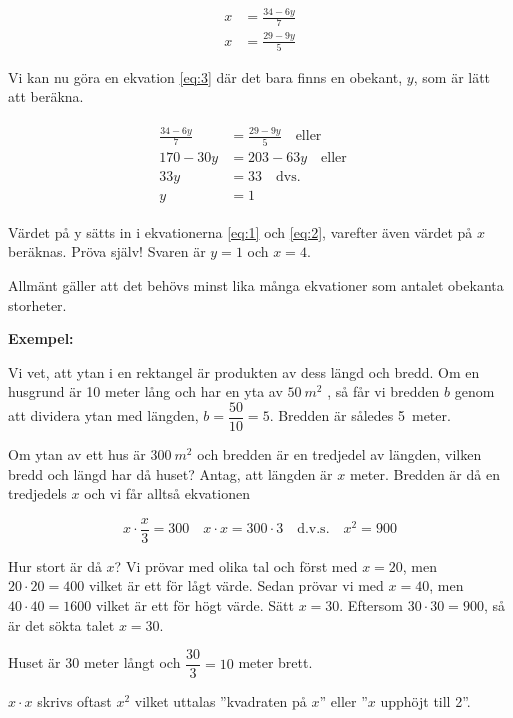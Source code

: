 \begin{align}
  \label{eq:1}
  x &= \frac{34-6y}{7}\\
  \label{eq:2}
  x &= \frac{29-9y}{5}
\end{align}

Vi kan nu göra en ekvation \ref{eq:3} där det bara finns en obekant, \(y\),
som är lätt att beräkna.

\begin{align}
  \begin{split}
    \label{eq:3}
    \frac{34 - 6y}{7} &= \frac{29 - 9y}{5}
    \quad \text{eller} \\
    170 - 30y &= 203-63y
    \quad \text{eller} \quad \\
    33y &= 33
    \quad \text{dvs.} \quad \\
    y &= 1
  \end{split}
\end{align}

Värdet på y sätts in i ekvationerna \ref{eq:1} och \ref{eq:2}, varefter även
värdet på \(x\) beräknas.
Pröva själv! Svaren är \(y = 1\) och \(x = 4\).

Allmänt gäller att det behövs minst lika många ekvationer som antalet obekanta
storheter.

\textbf{Exempel:}

Vi vet, att ytan i en rektangel är produkten av dess längd och bredd.
Om en husgrund är 10 meter lång och har en yta av \(50\ m^2\) , så får vi bredden
\(b\) genom att dividera ytan med längden, \(b = \dfrac{50}{10} = 5\).
Bredden är således 5~meter.

Om ytan av ett hus är \(300\ m^2\) och bredden är en tredjedel av längden, vilken
bredd och längd har då huset?
Antag, att längden är \(x\) meter.
Bredden är då en tredjedels \(x\) och vi får alltså ekvationen

\[
x \cdot \frac{x}{3} = 300 \quad
x \cdot x = 300 \cdot 3 \quad \text{d.v.s.}
\quad x^2 = 900
\]

Hur stort är då \(x\)?
Vi prövar med olika tal och först med \(x = 20\), men \(20 \cdot 20 = 400\)
vilket är ett för lågt värde.
Sedan prövar vi med \(x = 40\), men \(40 \cdot 40 = 1600\) vilket är ett för
högt värde.
Sätt \(x = 30\). Eftersom \(30 \cdot 30 = 900\), så är det sökta talet
\(x = 30\).

Huset är 30 meter långt och \(\dfrac{30}{3} = 10\) meter brett.

\(x \cdot x\) skrivs oftast \(x^2\) vilket uttalas ''kvadraten på \(x\)''
eller ''\(x\) upphöjt till 2''.

